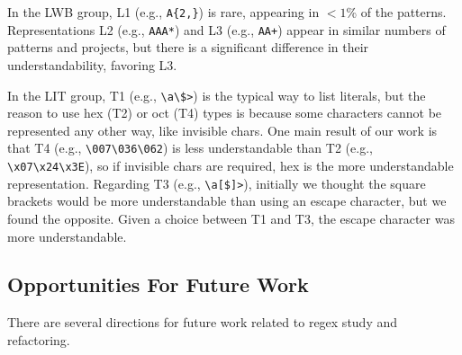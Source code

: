 In the LWB group,  L1 (e.g., \verb!A{2,}!) is rare, appearing in $<1$\% of the patterns. Representations L2 (e.g., \verb!AAA*!) and L3 (e.g., \verb!AA+!) appear in similar numbers of patterns and projects, but there is a significant difference in their understandability, favoring L3. 


In the LIT group, T1 (e.g., \verb!\a\$>!) is the typical way to list literals, but the reason to use hex (T2) or oct (T4) types is because some characters cannot be represented any other way, like invisible chars.  One main result of our work is that  T4 (e.g., \verb!\007\036\062!) is  less understandable   than T2 (e.g., \verb!\x07\x24\x3E!), so if invisible chars are required, hex is the more understandable representation. 
Regarding T3 (e.g., \verb!\a[$]>!), initially we thought the square brackets would be more understandable than using an escape character,  but we found the opposite. Given a choice between T1 and T3, the escape character was more understandable. 

\subsection{Opportunities For Future Work}
There are several directions for future work related to regex study and refactoring. 

